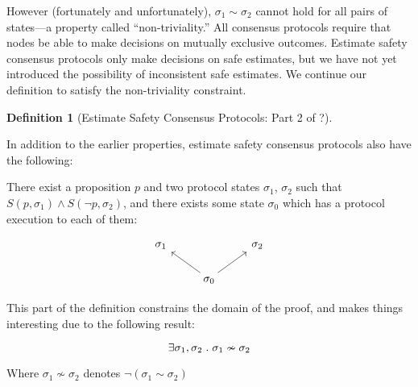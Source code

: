 \documentclass{article}
\theoremstyle{definition}
\newtheorem{defn}{Definition}[section]
\begin{document}
However (fortunately and unfortunately), $\sigma_1 \sim \sigma_2$ cannot hold for all pairs of states---a property called ``non-triviality.'' All consensus protocols require that nodes be able to make decisions on mutually exclusive outcomes. Estimate safety consensus protocols only make decisions on safe estimates, but we have not yet introduced the possibility of inconsistent safe estimates. We continue our definition to satisfy the non-triviality constraint.

\begin{defn}[Estimate Safety Consensus Protocols: Part 2 of ?]
\begin{description}

In addition to the earlier properties, estimate safety consensus protocols also have the following:

\item[(Non-triviality)]

There exist a proposition $p$ and two protocol states $\sigma_1$, $\sigma_2$ such that $S(p,\sigma_1) \land S(\neg{p},\sigma_2)$, and there exists some state $\sigma_0$ which has a protocol execution to each of them:

\begin{equation*}
\begin{tikzcd}
\sigma_1
  &
{}
  &
\sigma_2
  \\
  &
\sigma_0
  \arrow[ur,""]
  \arrow[ul,""]
\end{tikzcd}
\end{equation*}


\end{description}
\end{defn}

This part of the definition constrains the domain of the proof, and makes things interesting due to the following result:

\begin{lemma}
$$
\exists \sigma_1, \sigma_2 \hspace{1mm}.\hspace{1mm} \sigma_1 \nsim \sigma_2
$$
\end{lemma}

Where $\sigma_1 \nsim \sigma_2$ denotes $\neg{(\sigma_1 \sim \sigma_2)}$
\end{document}

